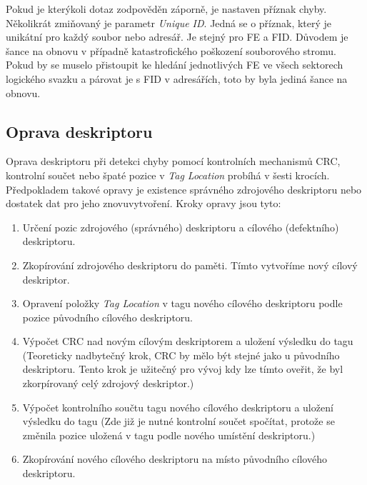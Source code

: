 Pokud je kterýkoli dotaz zodpověděn záporně, je nastaven příznak chyby.\\
Několikrát zmiňovaný je parametr \textit{Unique ID}. Jedná se o příznak, který je unikátní pro každý soubor nebo adresář. Je stejný pro FE a FID. Důvodem je šance na obnovu v případně katastrofického poškození souborového stromu. Pokud by se muselo přistoupit ke hledání jednotlivých FE ve všech sektorech logického svazku a párovat je s FID v adresářích, toto by byla jediná šance na obnovu. 

\subsection{Oprava deskriptoru}
\label{sec:oprava-deskriptoru}
Oprava deskriptoru při detekci chyby pomocí kontrolních mechanismů CRC, kontrolní součet nebo špaté pozice v \textit{Tag Location} probíhá v šesti krocích. Předpokladem takové opravy je existence správného zdrojového deskriptoru nebo dostatek dat pro jeho znovuvytvoření. Kroky opravy jsou tyto:
\begin{enumerate}
    \item Určení pozic zdrojového (správného) deskriptoru a cílového (defektního) deskriptoru.
    \item Zkopírování zdrojového deskriptoru do paměti. Tímto vytvoříme nový cílový deskriptor.
    \item Opravení položky \textit{Tag Location} v tagu nového cílového deskriptoru podle pozice původního cílového deskriptoru.
    \item Výpočet CRC nad novým cílovým deskriptorem a uložení výsledku do tagu (Teoreticky nadbytečný krok, CRC by mělo být stejné jako u původního deskriptoru. Tento krok je užitečný pro vývoj kdy lze tímto oveřit, že byl zkorpírovaný celý zdrojový deskriptor.)
    \item Výpočet kontrolního součtu tagu nového cílového deskriptoru a uložení výsledku do tagu (Zde již je nutné kontrolní součet spočítat, protože se změnila pozice uložená v tagu podle nového umístění deskriptoru.)
    \item Zkopírování nového cílového deskriptoru na místo původního cílového deskriptoru.
\end{enumerate}


